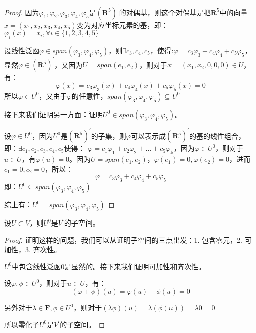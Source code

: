 \documentclass[10pt,a4paper,UTF8]{article}
\begin{document}
\begin{proof}
因为\(\varphi_{1},\varphi_{2},\varphi_{3},\varphi_{4},\varphi_{5}\)是\((\mathbf{R}^{5})^{'}\)的对偶基，则这个对偶基是把\(\mathbf{R}^{5}\)中的向量\(x=(x_{1},x_{2},x_{3},x_{4},x_{5})\)变为对应坐标元素的基，即：
\(\varphi_{i}(x) =x_{i},\forall i\in \{1,2,3,4,5\}\)

设线性泛函\(\varphi\in span(\varphi_{3},\varphi_{4},\varphi_{5})\)，则\(\exists c_{3},c_{4},c_{5}\)，使得:\(\varphi = c_{3}\varphi_{3}+c_{4}\varphi_{4} + c_{5}\varphi_{5}\)，显然\(\varphi\in (\mathbf{R}^{5})^{'}\)，又因为\(U = span(e_{1},e_{2})\)，则对于\(x=(x_{1},x_{2},0,0,0)\in U\)，有：
\[\varphi(x) = c_{3}\varphi_{3}(x) + c_{4}\varphi_{4}(x) + c_{5}\varphi_{5}(x) = 0\]
所以\(\varphi\in U^{0}\)，又由于\(\varphi\)的任意性，\(span(\varphi_{3},\varphi_{4},\varphi_{5})\subseteq U^{0}\)

接下来我们证明另一方面：证明\(U^{0}\in span(\varphi_{3},\varphi_{4},\varphi_{5})\)。

设\(\varphi\in U^{0}\)，因为\(U^{0}\)是\((\mathbf{R}^{5})^{'}\)的子集，则\(\varphi\)可以表示成\((\mathbf{R}^{5})^{'}\)的基的线性组合，即：\(\exists c_{1},c_{2},c_{3},c_{4},c_{5}\)使得：
\(\varphi = c_{1}\varphi_{1} + c_{2}\varphi_{2} +\ldots + c_{5}\varphi_{5}\)，因为\(\varphi\in U^{0}\)，则对于\(u\in U\)，有\(\varphi(u) = 0\)。因为\(U=span(e_{1},e_{2})\)，\(\varphi(e_{1}) = 0, \varphi(e_{2}) = 0\)，进而\(c_{1} = 0,c_{2} = 0\)，所以：\[\varphi = c_{3}\varphi_{3} + c_{4}\varphi_{4} + c_{5}\varphi_{5}\] 即：\(U^{0}\subseteq span(\varphi_{3},\varphi_{4},\varphi_{5})\)


综上有：\(U^{0} = span(\varphi_{3},\varphi_{4},\varphi_{5})\)
\end{proof}

\begin{theorem}
设\(U\subset V\)，则\(U^{0}\)是\(V^{'}\)的子空间。
\end{theorem}

\begin{proof}
证明这样的问题，我们可以从证明子空间的三点出发：1. 包含零元，2. 可加性，3. 齐次性。

\(U^{0}\)中包含线性泛函\(0\)是显然的。接下来我们证明可加性和齐次性。

设\(\varphi,\phi\in U^{0}\)，则对于\(u\in U\)，有：
\begin{equation}
\label{eq:1}
(\varphi + \phi)(u) = \varphi(u) + \phi(u) = 0
\end{equation}

另外对于\(\lambda\in \mathbf{F},\phi\in U^{0}\)，则对于\((\lambda\phi)(u) = \lambda(\phi(u)) = \lambda 0 = 0\)

所以零化子\(U^{0}\)是\(V^{'}\)的子空间。
\end{proof}
\end{document}

